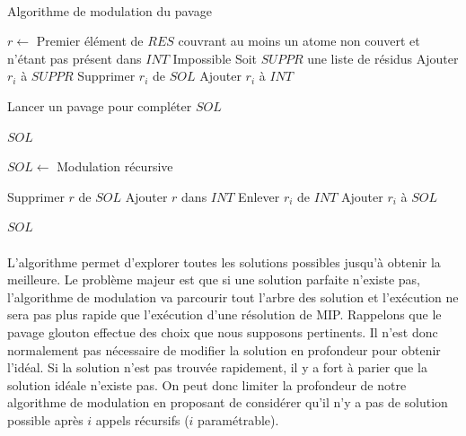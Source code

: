 \documentclass[12pt,french,twoside]{report}
\begin{document}
\paragraph{}
\begin{algorithm}[H]
  \caption{Algorithme de modulation du pavage}
  
  $r \gets$ Premier élément de $RES$ couvrant au moins un atome non couvert et n'étant pas présent dans $INT$\;
   {
    \KwRet Impossible\;
  }
  Soit $SUPPR$ une liste de résidus\;
   {
     {
      Ajouter $r_i$ à $SUPPR$\;
      Supprimer $r_i$ de $SOL$\;
      Ajouter $r_i$ à $INT$\;
    }
  }
  
  Lancer un pavage pour compléter $SOL$\;
  
   {
    \KwRet $SOL$\;
  }
  
  $SOL \gets$ Modulation récursive\;
  
   {
    Supprimer $r$ de $SOL$\;
    Ajouter $r$ dans $INT$\;
     {
      Enlever $r_i$ de $INT$\;
      Ajouter $r_i$ à $SOL$\;
    }
  }
  
  \KwRet $SOL$\;
\end{algorithm}


\paragraph{}L'algorithme permet d'explorer toutes les solutions possibles jusqu'à obtenir la meilleure. Le problème majeur
est que si une solution parfaite n'existe pas, l'algorithme de modulation va parcourir tout l'arbre des solution et l'exécution
ne sera pas plus rapide que l'exécution d'une résolution de MIP. Rappelons que le pavage glouton effectue des choix que nous
supposons pertinents. Il n'est donc normalement pas nécessaire de modifier la solution en profondeur pour 
obtenir l'idéal. Si la solution n'est pas trouvée rapidement, il y a fort à parier que la solution idéale n'existe
pas. On peut donc limiter la profondeur de notre algorithme de modulation en proposant de considérer qu'il n'y a pas de solution
possible après $i$ appels récursifs ($i$ paramétrable).
\end{document}
